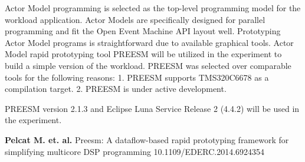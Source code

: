 Actor Model programming is selected as the top-level programming model for the workload application. Actor Models are specifically designed for parallel programming and fit the Open Event Machine API layout well. Prototyping Actor Model programs is straightforward due to available graphical tools. Actor Model rapid prototyping tool PREESM will be utilized in the experiment to build a simple version of the workload. PREESM was selected over comparable tools for the following reasons: 1. PREESM supports TMS320C6678 as a compilation target. 2. PREESM is under active development.

PREESM version 2.1.3 and Eclipse Luna Service Release 2 (4.4.2) will be used in the experiment.

\textbf{Pelcat M. et. al.} Preesm: A dataflow-based rapid prototyping framework for simplifying multicore DSP programming 10.1109/EDERC.2014.6924354
